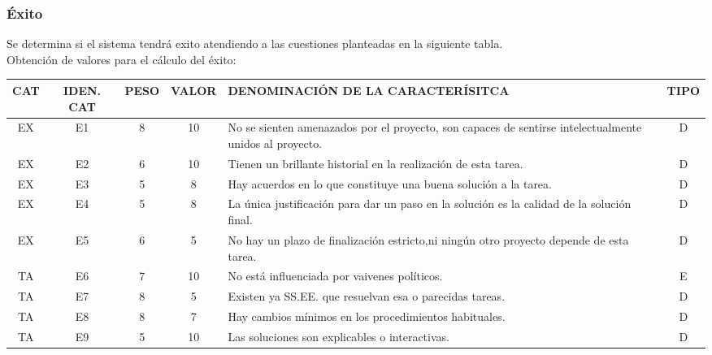 \documentclass[letterpaper,12pt]{article}
\begin{document}
\subsubsection{Éxito}
Se determina si el sistema tendrá exito atendiendo a las cuestiones planteadas en la siguiente tabla.\\

Obtención de valores para el cálculo del éxito:

\begin{tabular}{|c|c|c|c|p{7.3 cm}|c|}
	\hline 
	CAT & IDEN. CAT & PESO & VALOR & DENOMINACIÓN DE LA CARACTERÍSITCA & TIPO \\ 
	\hline 
	EX & E1 & 8 & 10 & No se sienten amenazados por el proyecto, son capaces de sentirse intelectualmente unidos al proyecto. & D \\ 
	\hline 
	EX & E2 & 6 & 10 & Tienen un brillante historial en la realización de esta tarea. & D \\ 
	\hline 
	EX & E3 & 5 & 8 & Hay acuerdos en lo que constituye una buena solución a la tarea. & D \\ 
	\hline 
	EX & E4 & 5 & 8 & La única justificación para dar un paso en la solución es la calidad de la solución final. & D \\ 
	\hline 
	EX & E5 & 6 & 5 & No hay un plazo de finalización estricto,ni ningún otro proyecto depende de esta tarea. & D \\ 
	\hline 
	TA & E6 & 7 & 10 & No está influenciada por vaivenes políticos. & E \\ 
	\hline 
	TA & E7 & 8 & 5 & Existen ya SS.EE. que resuelvan esa o parecidas tareas. & D \\ 
	\hline 
	TA & E8 & 8 & 7 & Hay cambios mínimos en los procedimientos habituales. & D \\ 
	\hline 
	TA & E9 & 5 & 10 & Las soluciones son explicables o interactivas. & D \\ 
	\hline 
\end{tabular} \\
\end{document}
